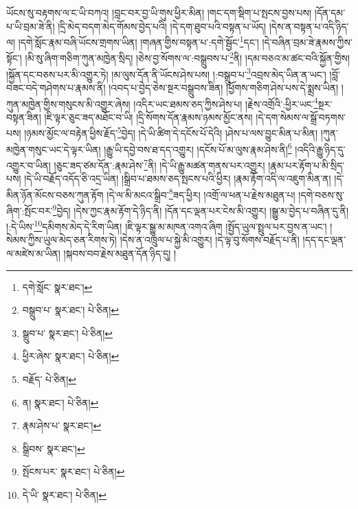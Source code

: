 ཡོངས་སུ་བརྟགས་ལ་ང་ཡི་བཀའ། །བླང་བར་བྱ་ཡི་གུས་ཕྱིར་མིན། །གང་དག་སྡིག་པ་སྤངས་བྱས་པས། །དོན་དམ་པ་ཡི་བྲམ་ཟེ་ནི། །དྲི་མེད་བདག་མེད་གོམས་བྱེད་པའི། །དེ་དག་ཐུབ་པའི་བསྟན་པ་ཡོད། །དེས་ན་བསྟན་པ་འདི་ཉིད་ལ། །དགེ་སློང་རྣམ་བཞི་ཡོངས་གྲགས་ཡིན། །གཞན་གྱིས་བསྟན་པ་:དགེ་སྦྱོང་\footnote{དགེ་སློང་  སྣར་ཐང་། }དང་། །དེ་བཞིན་བྲམ་ཟེ་རྣམས་ཀྱིས་སྟོང་། །མི་སུ་ཞིག་གཅིག་ཀུན་མཁྱེན་སྲིད། །ཅེས་བྱ་སོགས་ལ་:བསྒྲུབས་པ་\footnote{བསྒྲུབ་པ་  སྣར་ཐང་།  པེ་ཅིན། }ནི། །དམ་བཅའ་མ་ཚང་བའི་སྐྱོན་གྱིས། །སྐྱོན་དང་བཅས་པར་མི་འགྱུར་ཏེ། །མ་ལུས་དོན་ནི་ཡོངས་ཤེས་པས། །:བསྒྲུབ་པ་\footnote{སྒྲུབ་པ་  སྣར་ཐང་།  པེ་ཅིན། }འབྲས་མེད་ཡིན་ན་ཡང་། །བློ་བཟང་བདེ་གཤེགས་པ་རྣམས་ནི། །འབད་པ་བྱེད་ཅེས་སྔར་བསྒྲུབས་ཟིན། །ཕྱོགས་གཅིག་ཤེས་པས་དེ་སྨྲས་ཡིན། །ཀུན་མཁྱེན་གྱིས་གསུངས་མི་འགྱུར་ཞེས། །འདིར་ཡང་ཐམས་ཅད་ཀྱིས་ཤེས་པ། །རྗེས་འགྲོའི་:ཕྱིར་ཡང་\footnote{ཕྱིར་ཞེས་  སྣར་ཐང་།  པེ་ཅིན། }སྔར་བསྟན་ཟིན། །ཇི་ལྟར་ཅུང་ཟད་མཐོང་བ་ཡི། །དྲི་སོགས་དོན་རྣམས་ཉམས་མྱོང་ནས། །དེ་དག་སེམས་ལ་སྒྲོ་བཏགས་པས། །ཉམས་མྱོང་ལ་བརྟེན་ཕྱིས་རྗོད་\footnote{བརྗོད་  པེ་ཅིན། }བྱེད། །དེ་ཡི་ཚིག་དེ་དངོས་པོ་དེའི། །ཤེས་པ་ལས་བྱུང་མིན་པ་མིན། །ཀུན་མཁྱེན་གསུང་ཡང་དེ་ལྟར་ཡིན། །རྒྱུ་ཡི་དབྱེ་བས་ཐ་དད་འགྱུར། །དངོས་པོ་མ་ལུས་རྣམ་ཤེས་ནི།\footnote{ན།  སྣར་ཐང་།  པེ་ཅིན། } །འདིའི་རྒྱུ་ཉིད་དུ་འགྱུར་བ་ཡིན། །ཅུང་ཟད་ཙམ་དོན་:རྣམ་ཤེས་\footnote{རྣམ་ཤེས་པ་  སྣར་ཐང་། }ནི། །དེ་ཡི་རྒྱུ་མཚན་གནས་པར་འགྱུར། །རྣམ་པར་རྟོག་པ་མི་སྲིད་པས། །དེ་ཡི་བརྗོད་འདོད་ཅི་འདྲ་ཡིན། །སྒྲིབ་པ་ཐམས་ཅད་སྤངས་པའི་ཕྱིར། །རྣམ་རྟོག་འདི་ལ་འཇུག་མིན་ན། །དེ་མིན་ཉོན་མོངས་བཅས་ཀུན་རྟོག །དེ་ལ་མི་མངའ་སྒྲིབ་\footnote{སྒྲིབས་  སྣར་ཐང་། }ཟད་ཕྱིར། །འགྲོ་ལ་ཕན་པ་རྗེས་མཐུན་པ། །དགེ་བཅས་སུ་ཞིག་:སྤོང་བར་\footnote{སྤོངས་པར་  སྣར་ཐང་།  པེ་ཅིན། }བྱེད། །དེས་ཀྱང་རྣམ་རྟོག་དེ་ཉིད་ནི། །དོན་དང་ལྡན་པར་ངེས་མི་འགྱུར། །སྒྱུ་མ་བྱེད་པ་བཞིན་དུ་ནི། །:དེ་ཡིས་\footnote{དེ་ཡི་  སྣར་ཐང་།  པེ་ཅིན། }དམིགས་མེད་དེ་རིག་ཡིན། །ཇི་ལྟར་སྒྱུ་མ་མཁན་འགའ་ཞིག །སྤྱོད་ཡུལ་སྤྲུལ་པར་བྱས་ན་ཡང་། །སེམས་ཀྱིས་ཡུལ་མེད་ཅན་རིགས་ཏེ། །དེས་ན་འཁྲུལ་པ་སྐྱེ་མི་འགྱུར། །དེ་ལྟ་བུ་སོགས་བརྗོད་པ་ནི། །དད་དང་ལྡན་ལ་མཛེས་མ་ཡིན། །སྐབས་བབ་རྗེས་མཐུན་དོན་ཉིད་དུ། །
